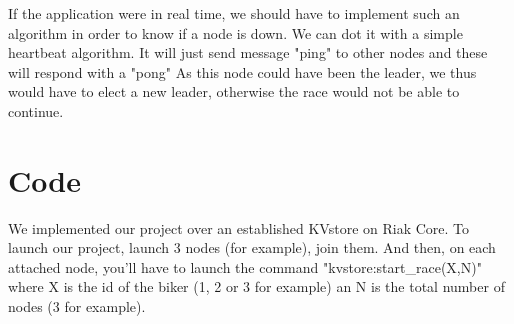 \documentclass[a4paper, 11pt]{article}
\begin{document}
If the application were in real time, we should have to implement such an algorithm in order to know if a node is down. We can dot it with a simple heartbeat algorithm. It will just send message "ping" to other nodes and these will respond with a "pong" As this node could have been the leader, we thus would have to elect a new leader, otherwise the race would not be able to continue.

\section{Code}

We implemented our project over an established KVstore on Riak Core. To launch our project, launch 3 nodes (for example), join them. And then, on each attached node, you'll have to launch the command "kvstore:start\_race(X,N)" where X is the id of the biker (1, 2 or 3 for example) an N is the total number of nodes (3 for example).  
\end{document}
